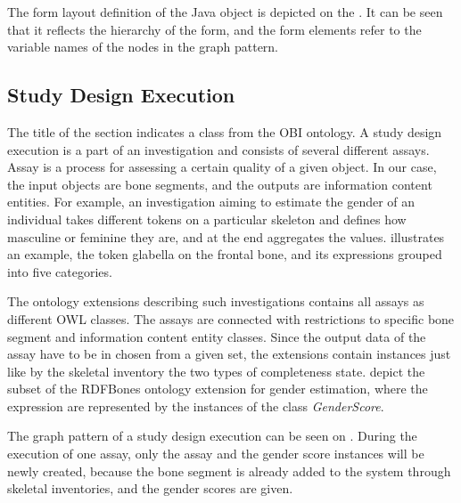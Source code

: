 
The form layout definition of the Java object is depicted on the . It can be seen that it reflects the hierarchy of the form, and the form elements refer to the variable names of the nodes in the graph pattern.


\subsection{Study Design Execution} \label{43}

The title of the section indicates a class from the OBI ontology. A study design execution is a part of an investigation and consists of several different assays. Assay is a process for assessing a certain quality of a given object. In our case, the input objects are bone segments, and the outputs are information content entities. For example, an investigation aiming to estimate the gender of an individual takes different tokens on a particular skeleton and defines how masculine or feminine they are, and at the end aggregates the values.  illustrates an example, the token glabella on the frontal bone, and its expressions grouped into five categories.


The ontology extensions describing such investigations contains all assays as different OWL classes. The assays are connected with restrictions to specific bone segment and information content entity classes. Since the output data of the assay have to be in chosen from a given set, the extensions contain instances just like by the skeletal inventory the two types of completeness state.  depict the subset of the RDFBones ontology extension for gender estimation, where the expression are represented by the instances of the class \textit{GenderScore}.


The graph pattern of a study design execution can be seen on . During the execution of one assay, only the assay and the gender score instances will be newly created, because the bone segment is already added to the system through skeletal inventories, and the gender scores are given.

